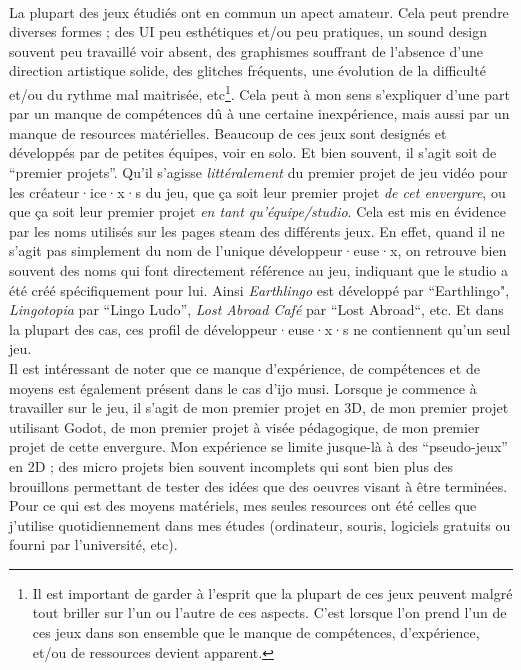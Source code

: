 \documentclass{scrartcl}
\let\emph\relax %
\begin{document}
		\emph{Amateurisme}\\
		La plupart des jeux étudiés ont en commun un apect amateur. Cela peut prendre diverses formes ;  des UI peu esthétiques et/ou peu pratiques, un sound design souvent peu travaillé voir absent, des graphismes souffrant de l’absence d’une direction artistique solide, des glitches fréquents, une évolution de la difficulté et/ou du rythme mal maitrisée, etc\footnote{Il est important de garder à l'esprit que la plupart de ces jeux peuvent malgré tout briller sur l'un ou l'autre de ces aspects. C'est lorsque l'on prend l'un de ces jeux dans son ensemble que le manque de compétences, d'expérience, et/ou de ressources devient apparent.}. Cela peut à mon sens s'expliquer d'une part par un manque de compétences dû à une certaine inexpérience, mais aussi par un manque de resources matérielles. Beaucoup de ces jeux sont designés et développés par de petites équipes, voir en solo. Et bien souvent, il s'agit soit de “premier projets”. Qu'il s'agisse \textit{littéralement} du premier projet de jeu vidéo pour les créateur·ice·x·s du jeu, que ça soit leur premier projet \textit{de cet envergure}, ou que ça soit leur premier projet \textit{en tant qu'équipe/studio}. Cela est mis en évidence par les noms utilisés sur les pages steam des différents jeux. En effet, quand il ne s'agit pas simplement du nom de l'unique développeur·euse·x, on retrouve bien souvent des noms qui font directement référence au jeu, indiquant que le studio a été créé spécifiquement pour lui. Ainsi \textit{Earthlingo} est développé par “Earthlingo", \textit{Lingotopia} par “Lingo Ludo”, \textit{Lost Abroad Café} par “Lost Abroad“, etc. Et dans la plupart des cas, ces profil de développeur·euse·x·s ne contiennent qu'un seul jeu.\\
		
		Il est intéressant de noter que ce manque d'expérience, de compétences et de moyens est également présent dans le cas d'ijo musi. Lorsque je commence à travailler sur le jeu, il s'agit de mon premier projet en 3D, de mon premier projet utilisant Godot, de mon premier projet à visée pédagogique, de mon premier projet de cette envergure. Mon expérience se limite jusque-là à des “pseudo-jeux” en 2D ; des micro projets bien souvent incomplets qui sont bien plus des brouillons permettant de tester des idées que des oeuvres visant à être terminées. Pour ce qui est des moyens matériels, mes seules resources ont été celles que j'utilise quotidiennement dans mes études (ordinateur, souris, logiciels gratuits ou fourni par l'université, etc).\\
		
\end{document}
